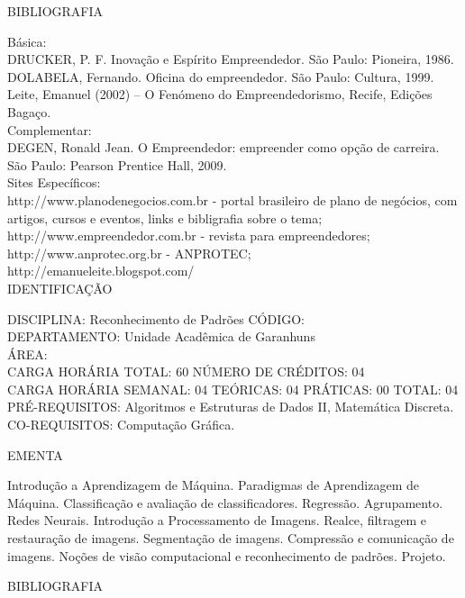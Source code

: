 \documentclass[
	12pt,				%
	openright,			%
  oneside,     %
	a4paper,			%
	chapter=TITLE,		%
	english,			%
	french,				%
	spanish,			%
	brazil				%
	]{abntex2}
\begin{document}
\begin{apendicesenv}
BIBLIOGRAFIA 

Básica:\\
DRUCKER, P. F. Inovação e Espírito Empreendedor. São Paulo: Pioneira,
1986.\\
DOLABELA, Fernando. Oficina do empreendedor. São Paulo: Cultura, 1999.\\
Leite, Emanuel (2002) -- O Fenómeno do Empreendedorismo, Recife, Edições
Bagaço.\\
Complementar:\\
DEGEN, Ronald Jean. O Empreendedor: empreender como opção de carreira. São Paulo: Pearson Prentice Hall, 2009.\\
Sites Específicos:\\
http://www.planodenegocios.com.br - portal brasileiro de plano de negócios, com artigos, cursos e eventos, links e bibligrafia sobre o tema;\\
http://www.empreendedor.com.br - revista para empreendedores;\\
http://www.anprotec.org.br - ANPROTEC;\\
http://emanueleite.blogspot.com/\\


\newpage IDENTIFICAÇÃO

DISCIPLINA: Reconhecimento de Padrões CÓDIGO:\\ 
DEPARTAMENTO: Unidade Acadêmica de Garanhuns\\
ÁREA: \\
CARGA HORÁRIA TOTAL: 60 NÚMERO DE CRÉDITOS: 04\\
CARGA HORÁRIA SEMANAL: 04 TEÓRICAS: 04 PRÁTICAS: 00 TOTAL: 04\\
PRÉ-REQUISITOS: Algoritmos e Estruturas de Dados II, Matemática
Discreta.\\
CO-REQUISITOS: Computação Gráfica.

EMENTA 

Introdução a Aprendizagem de Máquina. Paradigmas de Aprendizagem de
Máquina. Classificação e avaliação de classificadores. Regressão.
Agrupamento. Redes Neurais. Introdução a Processamento de Imagens.
Realce, filtragem e restauração de imagens. Segmentação de imagens.
Compressão e comunicação de imagens. Noções de visão computacional e
reconhecimento de padrões. Projeto.

BIBLIOGRAFIA 


\end{apendicesenv}
\end{document}
